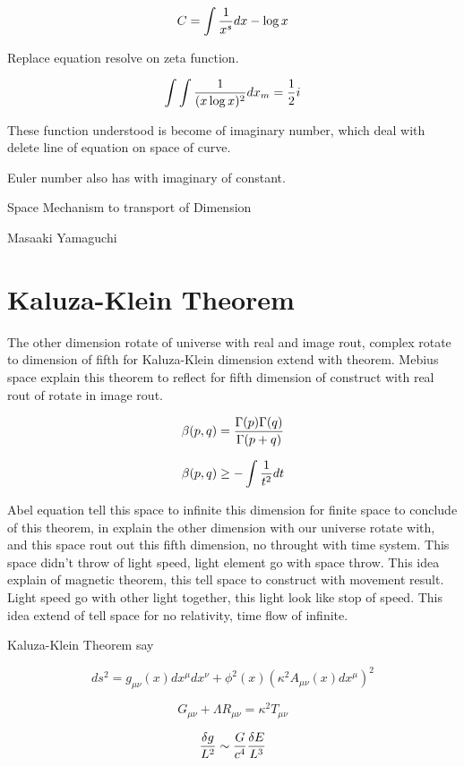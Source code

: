 \documentclass{jsarticle}
\begin{document}
$$ C = \int {1 \over x^s}dx - \log x $$

  Replace equation resolve on zeta function.

  $$ \int \int {1 \over (x \log x)^2}dx_{m} = {1 \over 2}i $$

  These function understood is become of imaginary number, which deal with delete line of equation on space of curve.

Euler number also has with imaginary of constant.


\newpage
\begin{center}
\large	Space Mechanism to transport of Dimension
\end{center}
\begin{center}Masaaki Yamaguchi
\end{center}


\section{Kaluza-Klein Theorem}

  The other dimension rotate of universe with real and image rout, complex rotate to dimension of fifth for
Kaluza-Klein dimension extend with theorem. Mebius space explain this theorem to reflect for fifth dimension
of construct with real rout of rotate in image rout.

  $$ \beta (p,q) = {\Gamma (p) \Gamma(q) \over \Gamma(p + q)} $$

  $$ \beta (p,q) \ge - \int {1 \over t^2}dt $$

  Abel equation tell this space to infinite this dimension for finite space to conclude of this theorem, 
in explain the other dimension with our universe rotate with, and this space rout out this fifth
dimension, no throught with time system. This space didn't throw of light speed, light element go with
space throw. This idea explain of magnetic theorem, this tell space to construct with movement result.
Light speed go with other light together, this light look like stop of speed. This idea extend
of tell space for no relativity, time flow of infinite.

  Kaluza-Klein Theorem say 

  $$ ds^2 = g_{\mu\nu} (x) dx^{\mu}dx^{\nu} + \phi^2 (x) (\kappa^2 A_{\mu\nu} (x) dx^{\mu})^2 $$

  $$ G_{\mu\nu} + \Lambda R_{\mu\nu} = \kappa^2 T_{\mu\nu} $$

  $$ {\delta g \over L^2} \sim {G \over c^4}{\delta E \over L^3} $$
\end{document}

